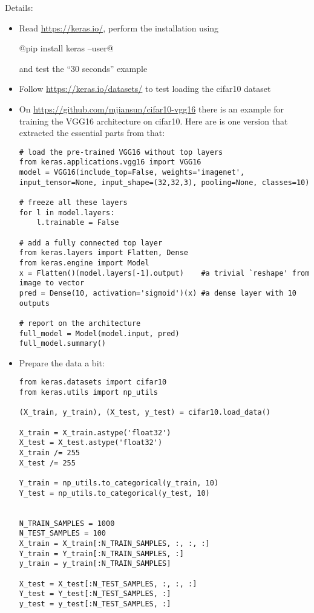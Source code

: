 Details:
\begin{itemize}
\item Read \url{https://keras.io/}, perform the installation using

@pip install keras --user@

and test the ``30 seconds'' example

\item Follow \url{https://keras.io/datasets/} to test loading the cifar10 dataset
\item On \url{https://github.com/mjiansun/cifar10-vgg16} there is an example for training the VGG16 architecture on cifar10. Here are is one version that extracted the essential parts from that:
\begin{code}
\begin{Verbatim}
# load the pre-trained VGG16 without top layers
from keras.applications.vgg16 import VGG16
model = VGG16(include_top=False, weights='imagenet', input_tensor=None, input_shape=(32,32,3), pooling=None, classes=10)

# freeze all these layers
for l in model.layers:
    l.trainable = False

# add a fully connected top layer
from keras.layers import Flatten, Dense
from keras.engine import Model
x = Flatten()(model.layers[-1].output)    #a trivial `reshape' from image to vector
pred = Dense(10, activation='sigmoid')(x) #a dense layer with 10 outputs

# report on the architecture
full_model = Model(model.input, pred)
full_model.summary()
\end{Verbatim}
\end{code}

\item Prepare the data a bit:
\begin{code}
\begin{Verbatim}
from keras.datasets import cifar10
from keras.utils import np_utils

(X_train, y_train), (X_test, y_test) = cifar10.load_data()

X_train = X_train.astype('float32')
X_test = X_test.astype('float32')
X_train /= 255
X_test /= 255

Y_train = np_utils.to_categorical(y_train, 10)
Y_test = np_utils.to_categorical(y_test, 10)


N_TRAIN_SAMPLES = 1000
N_TEST_SAMPLES = 100
X_train = X_train[:N_TRAIN_SAMPLES, :, :, :]
Y_train = Y_train[:N_TRAIN_SAMPLES, :]
y_train = y_train[:N_TRAIN_SAMPLES]

X_test = X_test[:N_TEST_SAMPLES, :, :, :]
Y_test = Y_test[:N_TEST_SAMPLES, :]
y_test = y_test[:N_TEST_SAMPLES, :]


\end{Verbatim}
\end{code}
\end{itemize}
